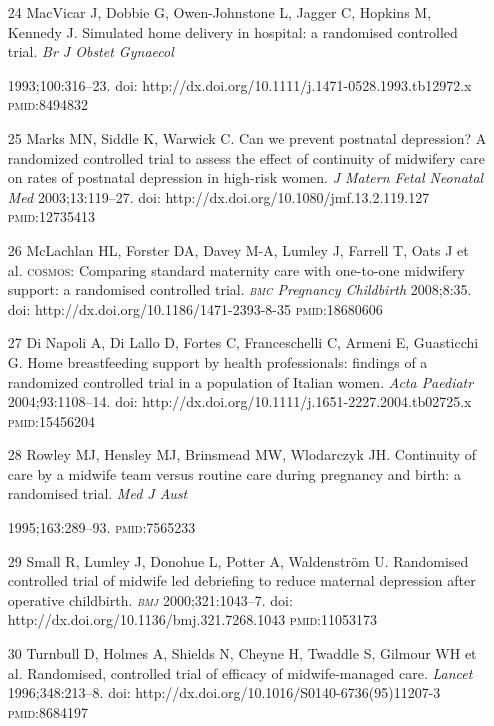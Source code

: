 \documentclass{article}
\begin{document}
\begin{itemize}
\item[24] MacVicar J, Dobbie G, Owen-Johnstone L, Jagger C, Hopkins M, Kennedy
J. Simulated
home delivery in hospital: a randomised controlled trial. \textit{Br J Obstet
Gynaecol}

1993;100:316–23. doi: http://dx.doi.org/10.1111/j.1471-0528.1993.tb12972.x
\textsc{pmid}:8494832

\item[25] Marks MN, Siddle K, Warwick C. Can we prevent postnatal depression? A
randomized
controlled trial to assess the effect of continuity of midwifery care on rates
of postnatal
depression in high-risk women. \textit{J Matern Fetal Neonatal Med}
2003;13:119–27. doi:
http://dx.doi.org/10.1080/jmf.13.2.119.127 \textsc{pmid}:12735413

\item[26] McLachlan HL, Forster DA, Davey M-A, Lumley J, Farrell T, Oats J et
al. \textsc{cosmos}:
Comparing standard maternity care with one-to-one midwifery support: a
randomised controlled trial.
\textit{\textsc{bmc} Pregnancy Childbirth}
2008;8:35. doi: http://dx.doi.org/10.1186/1471-2393-8-35
\textsc{pmid}:18680606

\item[27] Di Napoli A, Di Lallo D, Fortes C, Franceschelli C, Armeni E,
Guasticchi G. Home
breastfeeding support by health professionals: findings of a randomized
controlled trial in a
population of Italian women. \textit{Acta Paediatr}
2004;93:1108–14. doi:
http://dx.doi.org/10.1111/j.1651-2227.2004.tb02725.x \textsc{pmid}:15456204

\item[28] Rowley MJ, Hensley MJ, Brinsmead MW, Wlodarczyk JH. Continuity of care
by a midwife
team versus routine care during pregnancy and birth: a randomised trial.
\textit{Med J Aust}

1995;163:289–93. \textsc{pmid}:7565233

\item[29] Small R, Lumley J, Donohue L, Potter A, Waldenström U. Randomised
controlled trial
of midwife led debriefing to reduce maternal depression after operative
childbirth.
\textit{\textsc{bmj}}
2000;321:1043–7. doi: http://dx.doi.org/10.1136/bmj.321.7268.1043
\textsc{pmid}:11053173

\item[30] Turnbull D, Holmes A, Shields N, Cheyne H, Twaddle S, Gilmour WH et
al. Randomised,
controlled trial of efficacy of midwife-managed care. \textit{Lancet}
1996;348:213–8. doi:
http://dx.doi.org/10.1016/S0140-6736(95)11207-3 \textsc{pmid}:8684197


\end{itemize}
\end{document}
